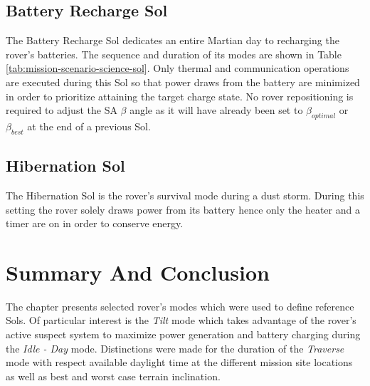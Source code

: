 \clearpage
\subsection{Battery Recharge Sol}
\label{sec:ReferenceSols:BatteryRechargeSol}
The Battery Recharge Sol dedicates an entire Martian day to recharging the rover's batteries. The sequence and duration of its modes are shown in Table \ref{tab:mission-scenario-science-sol}. Only thermal and communication operations are executed during this Sol so that power draws from the battery are minimized in order to prioritize attaining the target charge state. No rover repositioning is required to adjust the \ac{SA} $\beta$ angle as it will have already been set to $\beta_{optimal}$ or $\beta_{best}$ at the end of a previous Sol.



\subsection{Hibernation Sol}
\label{sec:ReferenceSols:HibernationSol}
The Hibernation Sol is the rover's survival mode during a dust storm. During this setting the rover solely draws power from its battery hence only the heater and a timer are on in order to conserve energy.



\section{Summary And Conclusion}
\label{sec:ReferenceSols:SummaryAndConclusion}
The chapter presents selected rover's modes which were used to define reference Sols. Of particular interest is the \textit{Tilt} mode which takes advantage of the rover's active suspect system to maximize power generation and battery charging during the \textit{Idle - Day} mode. Distinctions were made for the duration of the \textit{Traverse} mode with respect available daylight time at the different mission site locations as well as best and worst case terrain inclination.

